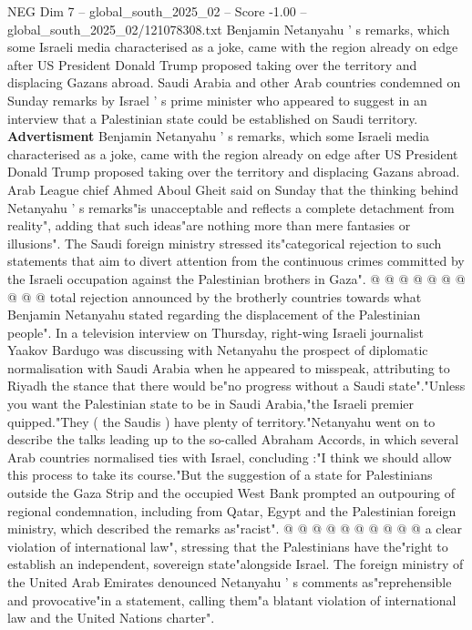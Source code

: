 \begin{textsample}{NEG Dim 7 – global\_south\_2025\_02 – Score -1.00 – global\_south\_2025\_02/121078308.txt}  \label{ex:f7_neg_031}
Benjamin Netanyahu ' s remarks, which some Israeli media characterised as a joke, came with the region already on edge after US President Donald Trump proposed taking over the territory and displacing Gazans abroad.
Saudi Arabia and other Arab countries condemned on Sunday remarks by Israel ' s prime minister who appeared to suggest in an interview that a Palestinian state could be established on Saudi territory. \textbf{Advertisment} Benjamin Netanyahu ' s remarks, which some Israeli media characterised as a joke, came with the region already on edge after US President Donald Trump proposed taking over the territory and displacing Gazans abroad.
Arab League chief Ahmed Aboul Gheit said on Sunday that the thinking behind Netanyahu ' s remarks"is unacceptable and reflects a complete detachment from reality", adding that such ideas"are nothing more than mere fantasies or illusions".
The Saudi foreign ministry stressed its"categorical rejection to such statements that aim to divert attention from the continuous crimes committed by the Israeli occupation against the Palestinian brothers in Gaza". @ @ @ @ @ @ @ @ @ @ total rejection announced by the brotherly countries towards what Benjamin Netanyahu stated regarding the displacement of the Palestinian people".
In a television interview on Thursday, right-wing Israeli journalist Yaakov Bardugo was discussing with Netanyahu the prospect of diplomatic normalisation with Saudi Arabia when he appeared to misspeak, attributing to Riyadh the stance that there would be"no progress without a Saudi state"."Unless you want the Palestinian state to be in Saudi Arabia,"the Israeli premier quipped."They ( the Saudis ) have plenty of territory."Netanyahu went on to describe the talks leading up to the so-called Abraham Accords, in which several Arab countries normalised ties with Israel, concluding :"I think we should allow this process to take its course."But the suggestion of a state for Palestinians outside the Gaza Strip and the occupied West Bank prompted an outpouring of regional condemnation, including from Qatar, Egypt and the Palestinian foreign ministry, which described the remarks as"racist". @ @ @ @ @ @ @ @ @ @ a clear violation of international law", stressing that the Palestinians have the"right to establish an independent, sovereign state"alongside Israel.
The foreign ministry of the United Arab Emirates denounced Netanyahu ' s comments as"reprehensible and provocative"in a statement, calling them"a blatant violation of international law and the United Nations charter".

\end{textsample}

